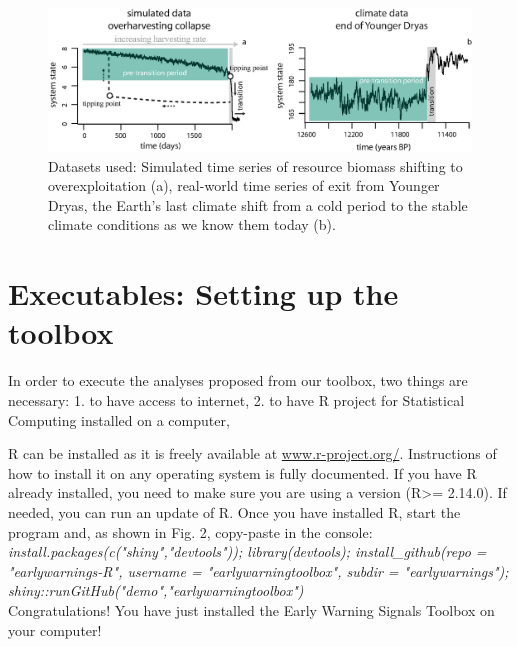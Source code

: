 \documentclass[12pt,a4paper,final]{article}
\begin{document}
\begin{doublespacing}
\begin{figure}[ht]
\begin{center}
\includegraphics[scale=0.75]{figure_data.eps}
\caption{Datasets used: Simulated time series of resource biomass shifting to overexploitation (a), real-world time series of exit from Younger Dryas, the Earth's last climate shift from a cold period to the stable climate conditions as we know them today (b).}
\end{center}
\end{figure}

\section{Executables: Setting up the toolbox}
In order to execute the analyses proposed from our toolbox, two things are necessary:
1. to have access to internet,
2. to have R project for Statistical Computing installed on a computer,

R can be installed as it is freely available at \url{www.r-project.org/}. Instructions of how to install it on any operating system is fully documented. If you have R already installed, you need to make sure you are using a version (R>= 2.14.0). If needed, you can run an update of R.
Once you have installed R, start the program and, as shown in Fig. 2, copy-paste in the console:\\
\textit{install.packages(c("shiny","devtools")); library(devtools); install\_github(repo = "earlywarnings-R", username = "earlywarningtoolbox", subdir = "earlywarnings");\\shiny::runGitHub("demo","earlywarningtoolbox")}
\\
Congratulations! You have just installed the Early Warning Signals Toolbox on your computer!


\end{doublespacing}
\end{document}
